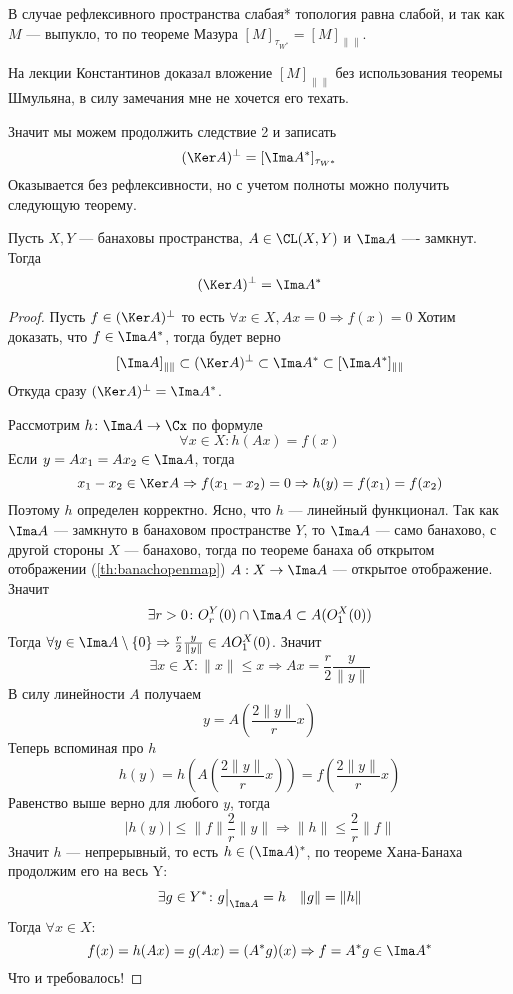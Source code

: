 \begin{remark}
	В случае рефлексивного пространства слабая* топология равна слабой, и так как $M$ --- выпукло, то по теореме Мазура $[M]_{\tau_{W^*}} = [M]_{\|\|}$. 
\end{remark}
\begin{remark}
	На лекции Константинов доказал вложение $[M]_{\|\|}$ без использования теоремы Шмульяна, в силу замечания мне не хочется его техать. 
\end{remark}
Значит мы можем продолжить следствие 2 и записать 
$$
(\Ker A)^\perp = [\Ima A^*]_{\tau_{W^*}}
$$
Оказывается без рефлексивности, но с учетом полноты можно получить следующую теорему.
\begin{theorem}\label{th:frspirit}
	Пусть $X,Y$ --- банаховы пространства, $A \in \CL(X,Y)$ и $\Ima A$ ---- замкнут. Тогда 
	$$
	(\Ker A)^\perp = \Ima A^*
	$$
\end{theorem}
\begin{proof}
	Пусть $f\in (\Ker A)^\perp$ то есть $\forall x \in X, Ax = 0 \Rightarrow f(x) = 0$
	Хотим доказать, что $f \in \Ima A^*$, тогда будет верно
	$$
	[\Ima A]_{\|\|} \subset (\Ker A)^\perp \subset \Ima A^* \subset [\Ima A^*]_{\|\|}
	$$
	Откуда сразу $(\Ker A)^\perp = \Ima A^*$.
	
	Рассмотрим $h \colon \Ima A \to \Cx$ по формуле
	$$
	\forall x \in X  \colon h(Ax) = f(x) 
	$$
	Если $y = Ax_1 = Ax_2 \in \Ima A$, тогда 
	$$
	x_1 - x_2 \in \Ker A \Rightarrow f(x_1 - x_2)  = 0 \Rightarrow h(y) = f(x_1) = f(x_2)
	$$
	Поэтому $h$ определен корректно. Ясно, что $h$ --- линейный функционал. Так как $\Ima A$ --- замкнуто в банаховом пространстве $Y$, то $\Ima A$ --- само банахово, с другой стороны $X$ --- банахово, тогда по теореме банаха об открытом отображении (\ref{th:banachopenmap}) $A : X \to \Ima A$ --- открытое отображение. Значит 
	$$
	\exists r > 0 \colon O_r^Y(0) \cap \Ima A \subset A(O_1^X(0))
	$$
	Тогда $\forall y \in \Ima A \setminus \{0\} \Rightarrow  \frac{r}{2}\frac{y}{\|y\|} \in AO_1^X(0)$. Значит
	$$
	\exists x \in X \colon \|x\| \leq x \Rightarrow Ax = \frac{r}{2}\frac{y}{\|y\|}
	$$
	В силу линейности $A$ получаем
	$$
	y = A\left(\frac{2\|y\|}{r}x\right)
	$$
	Теперь вспоминая про $h$ 
	$$
	h(y) = h\left(A\left(\frac{2\|y\|}{r}x\right)\right) = f\left(\frac{2\|y\|}{r}x\right)
	$$
	Равенство выше верно для любого $y$, тогда
	$$
	|h(y)| \leq \|f\|\frac{2}{r}\|y\| \Rightarrow \|h\| \leq \frac{2}{r}\|f\|
	$$
	Значит $h$ --- непрерывный, то есть $h \in (\Ima A)^*$, по теореме Хана-Банаха продолжим его на весь Y:
	$$
	\exists g \in Y^* \colon g\big|_{\Ima A} = h \quad \|g\| = \|h\| 
	$$
	Тогда $\forall x \in X$:
	$$
	f(x) = h(Ax) = g(Ax) = (A^*g)(x) \Rightarrow f = A^*g \in \Ima A^*
	$$
	Что и требовалось!
\end{proof}
